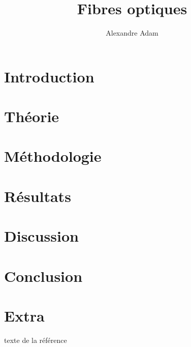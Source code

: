 \documentclass[10pt,letterpaper,twocolumn]{article}
\title{\vspace{-10mm}\Large
Fibres optiques%
\vspace{-4mm}}
\author{\large
Alexandre Adam
}
\date{\vspace{-8mm}}
\begin{document}
\twocolumn[
\maketitle
\begin{onecolabstract} %

\vspace{4mm} %
\end{onecolabstract}
]

\section{Introduction}\label{intro} %


\section{Théorie}\label{sec:theorie} %


\section{Méthodologie}\label{sec:metho} %


\section{Résultats}\label{sec:resultats} %

\section{Discussion}\label{sec:discuss} %

\section{Conclusion}\label{sec:conclusion} %

\section{Extra} %


\begin{thebibliography}{1}
 texte de la référence
\end{thebibliography}
\end{document}
